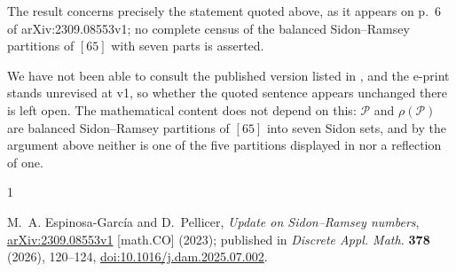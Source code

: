 \documentclass[11pt]{amsart}
\begin{document}
The result concerns precisely the statement quoted above, as it appears
on p.~6 of arXiv:2309.08553v1; no complete census of the balanced
Sidon--Ramsey partitions of $[65]$ with seven parts is asserted.

We have not been able to consult the published version listed in
\cite{EGP}, and the e-print stands unrevised at v1, so whether the
quoted sentence appears unchanged there is left open. The mathematical
content does not depend on this: $\mathcal P$ and $\rho(\mathcal P)$ are
balanced Sidon--Ramsey partitions of $[65]$ into seven Sidon sets, and
by the argument above neither is one of the five partitions displayed in
\cite{EGP} nor a reflection of one.

\begin{thebibliography}{1}

M.~A. Espinosa-Garc\'ia and D.~Pellicer,
\emph{Update on Sidon--Ramsey numbers},
\href{https://arxiv.org/abs/2309.08553v1}{arXiv:2309.08553v1}
[math.CO] (2023); published in
\emph{Discrete Appl. Math.} \textbf{378} (2026), 120--124,
\href{https://doi.org/10.1016/j.dam.2025.07.002}
{doi:10.1016/j.dam.2025.07.002}.

\end{thebibliography}
\end{document}
